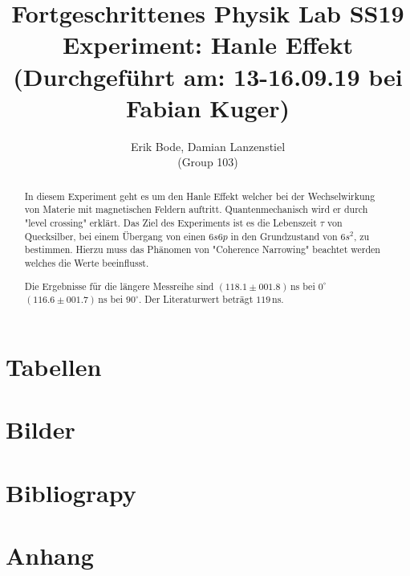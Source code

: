 \documentclass[30pt,a4paper]{article}
\title{
	\large Fortgeschrittenes Physik Lab	SS19 \\[4mm]
	\textbf{\LARGE Experiment: Hanle Effekt
	} \\[4mm]
	(Durchgeführt am: 13-16.09.19 bei Fabian Kuger) \\}
\author{Erik Bode, Damian Lanzenstiel \\ (Group 103)}
\begin{document}
	
	\begin{titlepage}
		\maketitle
		\vspace{2cm}
		\begin{abstract}
			In diesem Experiment geht es um den Hanle Effekt welcher bei der Wechselwirkung von Materie mit magnetischen Feldern auftritt. Quantenmechanisch wird er durch "level crossing" erklärt. Das Ziel des Experiments ist es die Lebenszeit $\tau$ von Quecksilber, bei einem Übergang von einen $6s6p$ in den Grundzustand von $6s^2$, zu bestimmen. Hierzu muss das Phänomen von "Coherence Narrowing" beachtet werden welches die Werte beeinflusst.\par Die Ergebnisse für die längere Messreihe sind $(118.1\pm001.8)\,$ns bei $0^\circ$ $(116.6\pm001.7)\,$ns bei $90^\circ$. Der Literaturwert beträgt $119\,$ns.
		\end{abstract}
	\end{titlepage}
	\newpage
	\tableofcontents
	\newpage
	
		
	
	
	
	
	
	
	\section{Tabellen}
	\listoftables
	\section{Bilder}
	\listoffigures
	\section{Bibliograpy}
	
	
	\section{Anhang}
	
\end{document}
